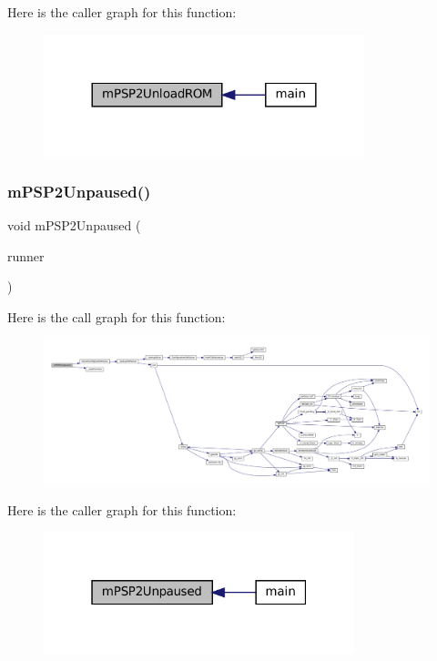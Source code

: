 Here is the caller graph for this function\+:
\nopagebreak
\begin{figure}[H]
\begin{center}
\leavevmode
\includegraphics[width=264pt]{psp2-context_8c_a94ad5d2964da6bad167ee85e5f021421_icgraph}
\end{center}
\end{figure}
\mbox{\label{psp2-context_8c_a02416ce4a85e3b948b2a1df34d901cb3}} 
\subsubsection{\texorpdfstring{m\+P\+S\+P2\+Unpaused()}{mPSP2Unpaused()}}
{\footnotesize\ttfamily void m\+P\+S\+P2\+Unpaused (\begin{DoxyParamCaption}\item[{struct \mbox{\hyperlink{structm_g_u_i_runner}{m\+G\+U\+I\+Runner}} $\ast$}]{runner }\end{DoxyParamCaption})}

Here is the call graph for this function\+:
\nopagebreak
\begin{figure}[H]
\begin{center}
\leavevmode
\includegraphics[width=350pt]{psp2-context_8c_a02416ce4a85e3b948b2a1df34d901cb3_cgraph}
\end{center}
\end{figure}
Here is the caller graph for this function\+:
\nopagebreak
\begin{figure}[H]
\begin{center}
\leavevmode
\includegraphics[width=256pt]{psp2-context_8c_a02416ce4a85e3b948b2a1df34d901cb3_icgraph}
\end{center}
\end{figure}


